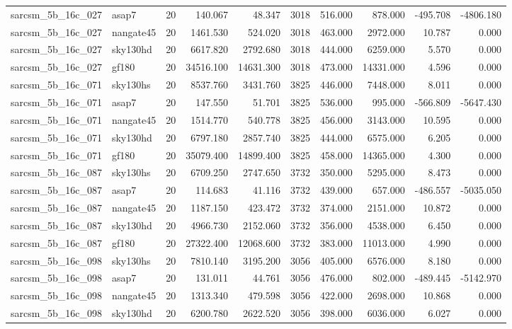 \begin{longtable}{llrrrrrrrr}
sarcsm\_5b\_16c\_027 & asap7 & 20 & 140.067 & 48.347 & 3018 & 516.000 & 878.000 & -495.708 & -4806.180 \\
sarcsm\_5b\_16c\_027 & nangate45 & 20 & 1461.530 & 524.020 & 3018 & 463.000 & 2972.000 & 10.787 & 0.000 \\
sarcsm\_5b\_16c\_027 & sky130hd & 20 & 6617.820 & 2792.680 & 3018 & 444.000 & 6259.000 & 5.570 & 0.000 \\
sarcsm\_5b\_16c\_027 & gf180 & 20 & 34516.100 & 14631.300 & 3018 & 473.000 & 14331.000 & 4.596 & 0.000 \\
sarcsm\_5b\_16c\_071 & sky130hs & 20 & 8537.760 & 3431.760 & 3825 & 446.000 & 7448.000 & 8.011 & 0.000 \\
sarcsm\_5b\_16c\_071 & asap7 & 20 & 147.550 & 51.701 & 3825 & 536.000 & 995.000 & -566.809 & -5647.430 \\
sarcsm\_5b\_16c\_071 & nangate45 & 20 & 1514.770 & 540.778 & 3825 & 456.000 & 3143.000 & 10.595 & 0.000 \\
sarcsm\_5b\_16c\_071 & sky130hd & 20 & 6797.180 & 2857.740 & 3825 & 444.000 & 6575.000 & 6.205 & 0.000 \\
sarcsm\_5b\_16c\_071 & gf180 & 20 & 35079.400 & 14899.400 & 3825 & 458.000 & 14365.000 & 4.300 & 0.000 \\
sarcsm\_5b\_16c\_087 & sky130hs & 20 & 6709.250 & 2747.650 & 3732 & 350.000 & 5295.000 & 8.473 & 0.000 \\
sarcsm\_5b\_16c\_087 & asap7 & 20 & 114.683 & 41.116 & 3732 & 439.000 & 657.000 & -486.557 & -5035.050 \\
sarcsm\_5b\_16c\_087 & nangate45 & 20 & 1187.150 & 423.472 & 3732 & 374.000 & 2151.000 & 10.872 & 0.000 \\
sarcsm\_5b\_16c\_087 & sky130hd & 20 & 4966.730 & 2152.060 & 3732 & 356.000 & 4538.000 & 6.450 & 0.000 \\
sarcsm\_5b\_16c\_087 & gf180 & 20 & 27322.400 & 12068.600 & 3732 & 383.000 & 11013.000 & 4.990 & 0.000 \\
sarcsm\_5b\_16c\_098 & sky130hs & 20 & 7810.140 & 3195.200 & 3056 & 405.000 & 6576.000 & 8.180 & 0.000 \\
sarcsm\_5b\_16c\_098 & asap7 & 20 & 131.011 & 44.761 & 3056 & 476.000 & 802.000 & -489.445 & -5142.970 \\
sarcsm\_5b\_16c\_098 & nangate45 & 20 & 1313.340 & 479.598 & 3056 & 422.000 & 2698.000 & 10.868 & 0.000 \\
sarcsm\_5b\_16c\_098 & sky130hd & 20 & 6200.780 & 2622.520 & 3056 & 398.000 & 6036.000 & 6.027 & 0.000 \\

\end{longtable}
